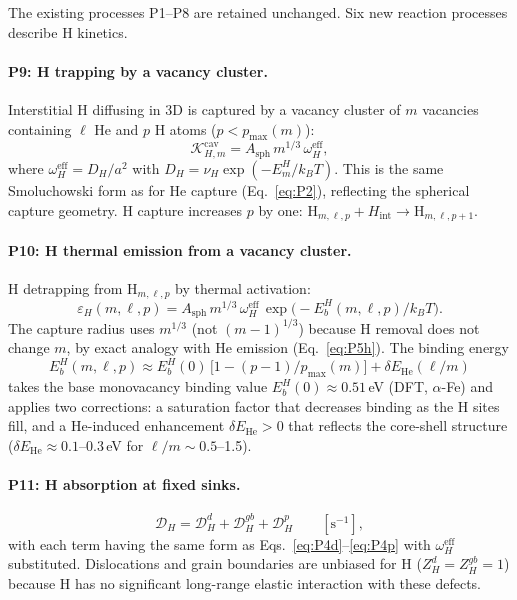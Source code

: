 The existing processes P1--P8 are retained unchanged.  Six new reaction
processes describe H kinetics.

\paragraph{P9: H trapping by a vacancy cluster.}
Interstitial H diffusing in 3D is captured by a vacancy cluster of $m$
vacancies containing $\ell$ He and $p$ H atoms
($p < p_{\max}(m)$):
\begin{equation}\label{eq:P9}
    \mathcal{K}_{H,m}^{\mathrm{cav}}
    = A_{\mathrm{sph}}\,m^{1/3}\,\omega_H^{\mathrm{eff}},
\end{equation}
where $\omega_H^{\mathrm{eff}} = D_H / a^2$ with
$D_H = \nu_H \exp(-E_m^H / k_B T)$.  This is the same Smoluchowski
form as for He capture (Eq.~\ref{eq:P2}), reflecting the spherical
capture geometry.  H capture increases $p$ by one:
$\mathrm{H}_{m,\ell,p} + H_{\mathrm{int}} \to \mathrm{H}_{m,\ell,p+1}$.

\paragraph{P10: H thermal emission from a vacancy cluster.}
H detrapping from $\mathrm{H}_{m,\ell,p}$ by thermal activation:
\begin{equation}\label{eq:P10}
    \varepsilon_H(m,\ell,p)
    = A_{\mathrm{sph}}\,m^{1/3}\,\omega_H^{\mathrm{eff}}\,
      \exp\!\bigl(-E_b^H(m,\ell,p)/k_BT\bigr).
\end{equation}
The capture radius uses $m^{1/3}$ (not $(m{-}1)^{1/3}$) because H removal
does not change $m$, by exact analogy with He emission (Eq.~\ref{eq:P5h}).
The binding energy
\begin{equation}\label{eq:EbH}
    E_b^H(m,\ell,p)
    \approx E_b^H(0)\,\bigl[1 - (p-1)/p_{\max}(m)\bigr]
    + \delta E_{\mathrm{He}}(\ell/m)
\end{equation}
takes the base monovacancy binding value
$E_b^H(0) \approx 0.51$\,eV (DFT, $\alpha$-Fe) and applies two
corrections: a saturation factor that decreases binding as the H
sites fill, and a He-induced enhancement $\delta E_{\mathrm{He}} > 0$
that reflects the core-shell structure
($\delta E_{\mathrm{He}} \approx 0.1$--0.3\,eV for
$\ell/m \sim 0.5$--1.5).

\paragraph{P11: H absorption at fixed sinks.}
\begin{equation}\label{eq:P11}
    \mathcal{D}_H = \mathcal{D}_H^d + \mathcal{D}_H^{gb} + \mathcal{D}_H^p
    \qquad [\text{s}^{-1}],
\end{equation}
with each term having the same form as Eqs.~\eqref{eq:P4d}--\eqref{eq:P4p}
with $\omega_H^{\mathrm{eff}}$ substituted.  Dislocations and grain
boundaries are unbiased for H ($Z_H^d = Z_H^{gb} = 1$) because H has
no significant long-range elastic interaction with these defects.

